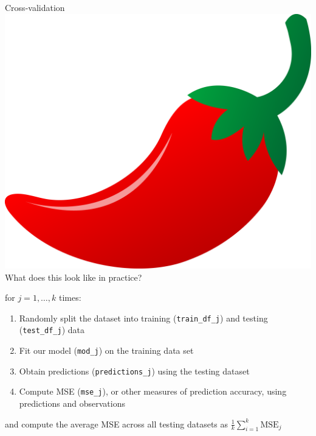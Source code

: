 \documentclass[10pt,t]{beamer}
\begin{document}
\begin{frame}{Cross-validation \includegraphics[scale=0.01]{chilipepper.png} }
What does this look like in practice?

\vspace{0.3cm}

for $j = 1, \dots, k$ times:

\vspace{0.3cm}

\begin{enumerate}
	\item Randomly split the dataset into training (\texttt{train\_df\_j}) and testing (\texttt{test\_df\_j}) data
	\item Fit our model (\texttt{mod\_j}) on the training data set
	\item Obtain predictions (\texttt{predictions\_j}) using the testing dataset 
	\item Compute MSE (\texttt{mse\_j}), or other measures of prediction accuracy, using predictions and observations 
\end{enumerate}

\vspace{0.3cm}

and compute the average MSE across all testing datasets as $\frac{1}{k} \sum_{i = 1}^k \text{MSE}_j$ 

\end{frame}
\end{document}

